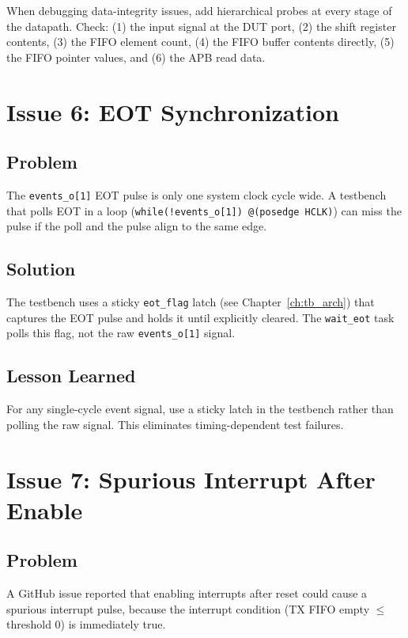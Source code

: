 When debugging data-integrity issues, add hierarchical probes at every stage of the datapath.
Check: (1) the input signal at the DUT port, (2) the shift register contents, (3) the FIFO
element count, (4) the FIFO buffer contents directly, (5) the FIFO pointer values, and
(6) the APB read data.

\section{Issue 6: EOT Synchronization}

\subsection{Problem}

The \texttt{events\_o[1]} EOT pulse is only one system clock cycle wide. A testbench that
polls EOT in a loop (\texttt{while(!events\_o[1]) @(posedge HCLK)}) can miss the pulse if
the poll and the pulse align to the same edge.

\subsection{Solution}

The testbench uses a sticky \texttt{eot\_flag} latch (see Chapter~\ref{ch:tb_arch}) that
captures the EOT pulse and holds it until explicitly cleared. The \texttt{wait\_eot} task
polls this flag, not the raw \texttt{events\_o[1]} signal.

\subsection{Lesson Learned}

For any single-cycle event signal, use a sticky latch in the testbench rather than
polling the raw signal. This eliminates timing-dependent test failures.

\section{Issue 7: Spurious Interrupt After Enable}

\subsection{Problem}

A GitHub issue reported that enabling interrupts after reset could cause a spurious interrupt
pulse, because the interrupt condition (TX FIFO empty $\leq$ threshold 0) is immediately true.

